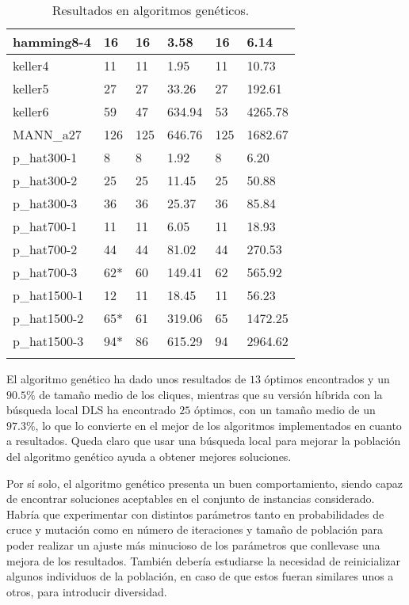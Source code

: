 \begin{small}
\begin{longtable}{l l l l l l}
    hamming8-4         & 16 & 16 & 3.58 & 16 & 6.14\\ \hline
    keller4            & 11 & 11 & 1.95 & 11 & 10.73\\ \hline
    keller5            & 27 & 27 & 33.26 & 27 & 192.61\\ \hline
    keller6            & 59 & 47 & 634.94 & 53 & 4265.78\\ \hline
    MANN\_a27          & 126 & 125 & 646.76 & 125 & 1682.67\\ \hline
    p\_hat300-1        & 8 & 8 & 1.92 & 8 & 6.20\\ \hline
    p\_hat300-2        & 25 & 25 & 11.45 & 25 & 50.88\\ \hline
    p\_hat300-3        & 36 & 36 & 25.37 & 36 & 85.84\\ \hline
    p\_hat700-1        & 11 & 11 & 6.05 & 11 & 18.93\\ \hline
    p\_hat700-2        & 44 & 44 & 81.02 & 44 & 270.53\\ \hline
    p\_hat700-3        & 62* & 60 & 149.41 & 62 & 565.92\\ \hline
    p\_hat1500-1       & 12 & 11 & 18.45 & 11 & 56.23\\ \hline
    p\_hat1500-2       & 65* & 61 & 319.06 & 65 & 1472.25\\ \hline
    p\_hat1500-3       & 94* & 86 & 615.29 & 94 & 2964.62\\ \hline
  \caption{Resultados en algoritmos genéticos.}
\end{longtable}
\end{small}

El algoritmo genético ha dado unos resultados de $13$ óptimos encontrados y un
$90.5\%$ de tamaño medio de los cliques, mientras que su versión híbrida con la
búsqueda local DLS ha encontrado $25$ óptimos, con un tamaño medio de un $97.3\%$,
lo que lo convierte en el mejor de los algoritmos implementados en cuanto a resultados.
Queda claro que usar una búsqueda local para mejorar la población del algoritmo
genético ayuda a obtener mejores soluciones.

Por sí solo, el algoritmo genético presenta un buen comportamiento, siendo capaz de
encontrar soluciones aceptables en el conjunto de instancias considerado. Habría
que experimentar con distintos parámetros tanto en probabilidades de cruce y mutación
como en número de iteraciones y tamaño de población para poder realizar un ajuste más
minucioso de los parámetros que conllevase una mejora de los resultados. También
debería estudiarse la necesidad de reinicializar algunos individuos de la población,
en caso de que estos fueran similares unos a otros, para introducir diversidad.

